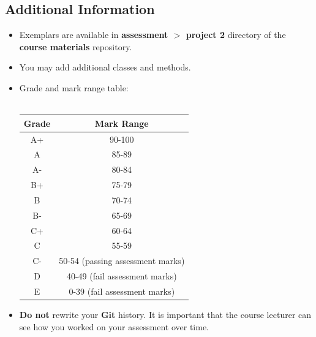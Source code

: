 \documentclass{article}
\begin{document}
\subsection*{Additional Information}
\begin{itemize}
    \item Exemplars are available in \textbf{assessment $>$ project 2} directory of the \textbf{course materials} repository.
    \item You may add additional classes and methods. 
    \item Grade and mark range table:\\\\
    \renewcommand{\arraystretch}{1.5}
    \begin{tabular}{|c|c|}
        \hline
        \textbf{Grade} & \textbf{Mark Range} \\ \hline
        A+ & 90-100  \\ \hline
        A & 85-89  \\ \hline
        A- & 80-84 \\ \hline
        B+ & 75-79   \\ \hline
        B & 70-74  \\ \hline
        B- & 65-69  \\ \hline
        C+ & 60-64  \\ \hline
        C & 55-59 \\ \hline
        C- & 50-54 (passing assessment marks)  \\ \hline
        D & 40-49 (fail assessment marks)   \\ \hline
        E & 0-39 (fail assessment marks)   \\ \hline
    \end{tabular}
    \item \textbf{Do not} rewrite your \textbf{Git} history. It is important that the course lecturer can see how you worked on your assessment over time.
\end{itemize}
\end{document}
